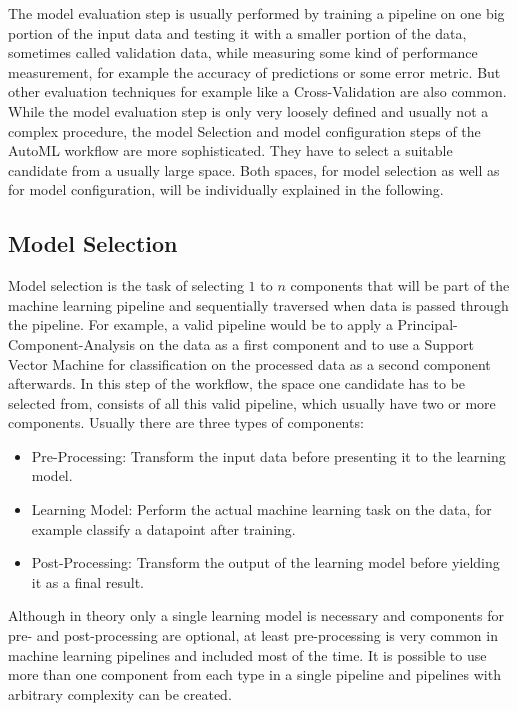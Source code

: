 The model evaluation step is usually performed by training a pipeline on one big portion of the input data and testing it with a smaller portion of the data, sometimes called validation data, while measuring some kind of performance measurement, for example the accuracy of predictions or some error metric.
But other evaluation techniques for example like a Cross-Validation are also common.\newline
While the model evaluation step is only very loosely defined and usually not a complex procedure, the model Selection and model configuration steps of the AutoML workflow are more sophisticated.
They have to select a suitable candidate from a usually large space. 
Both spaces, for model selection as well as for model configuration, will be individually explained in the following.

\subsection{Model Selection}
\label{sec:theory:automl:selection}
Model selection is the task of selecting $1$ to $n$ components that will be part of the machine learning pipeline and sequentially traversed when data is passed through the pipeline.
For example, a valid pipeline would be to apply a Principal-Component-Analysis on the data as a first component and to use a Support Vector Machine for classification on the processed data as a second component afterwards.
In this step of the workflow, the space one candidate has to be selected from, consists of all this valid pipeline, which usually have two or more components.\newline
Usually there are three types of components:
\begin{itemize}
    \item Pre-Processing: Transform the input data before presenting it to the learning model.
    \item Learning Model: Perform the actual machine learning task on the data, for example classify a datapoint after training.
    \item Post-Processing: Transform the output of the learning model before yielding it as a final result.
\end{itemize}
Although in theory only a single learning model is necessary and components for pre- and post-processing are optional, at least pre-processing is very common in machine learning pipelines and included most of the time.\newline
It is possible to use more than one component from each type in a single pipeline and pipelines with arbitrary complexity can be created.
